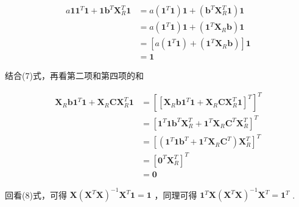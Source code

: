 \documentclass[UTF8]{ctexart}
\begin{document}
    \begin{equation}
    	\begin{aligned}
    		a \boldsymbol{1} \boldsymbol{1}^T \boldsymbol{1} + \boldsymbol{1} \boldsymbol{b}^T \boldsymbol{X}_R^T \boldsymbol{1} & = a (\boldsymbol{1}^T \boldsymbol{1}) \boldsymbol{1} + (\boldsymbol{b}^T \boldsymbol{X}_R^T \boldsymbol{1}) \boldsymbol{1} \\
    		& = a (\boldsymbol{1}^T \boldsymbol{1}) \boldsymbol{1} + (\boldsymbol{1}^T \boldsymbol{X}_R \boldsymbol{b}) \boldsymbol{1} \\
    		& = [a (\boldsymbol{1}^T \boldsymbol{1}) + (\boldsymbol{1}^T \boldsymbol{X}_R \boldsymbol{b})] \boldsymbol{1} \\
    		& = \boldsymbol{1}
    	\end{aligned}
    \end{equation}

    结合(7)式，再看第二项和第四项的和
    
    \begin{equation}
    	\begin{aligned}
    		\boldsymbol{X}_R \boldsymbol{b} \boldsymbol{1}^T \boldsymbol{1} + \boldsymbol{X}_R \boldsymbol{C} \boldsymbol{X}_R^T \boldsymbol{1} & = [[\boldsymbol{X}_R \boldsymbol{b} \boldsymbol{1}^T \boldsymbol{1} + \boldsymbol{X}_R \boldsymbol{C} \boldsymbol{X}_R^T \boldsymbol{1}]^T]^T \\
    		& = [\boldsymbol{1}^T \boldsymbol{1} \boldsymbol{b}^T \boldsymbol{X}_R^T + \boldsymbol{1}^T \boldsymbol{X}_R \boldsymbol{C}^T \boldsymbol{X}_R^T]^T \\
    		& = [(\boldsymbol{1}^T \boldsymbol{1} \boldsymbol{b}^T + \boldsymbol{1}^T \boldsymbol{X}_R \boldsymbol{C}^T) \boldsymbol{X}_R^T]^T \\
    		& =  [\boldsymbol{0}^T \boldsymbol{X}_R^T]^T \\
    		& = \boldsymbol{0}
       	\end{aligned}
    \end{equation}

    回看(8)式，可得 $ \boldsymbol{X} (\boldsymbol{X}^T \boldsymbol{X})^{-1} \boldsymbol{X}^T \boldsymbol{1} = \boldsymbol{1} $ ，同理可得 $ \boldsymbol{1}^T \boldsymbol{X} (\boldsymbol{X}^T \boldsymbol{X})^{-1} \boldsymbol{X}^T = \boldsymbol{1}^T $ .
    
	
	
	
%	
	
\end{document}
